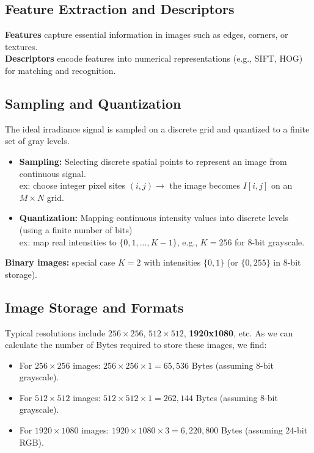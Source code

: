 \subsection{Feature Extraction and Descriptors}
\textbf{Features} capture essential information in images such as edges, corners, or textures.  \\
\textbf{Descriptors} encode features into numerical representations (e.g., SIFT, HOG) for matching and recognition.

\subsection{Sampling and Quantization}
The ideal irradiance signal is sampled on a discrete grid and quantized to a finite set of gray levels.
\begin{itemize}
    \item \textbf{Sampling:} Selecting discrete spatial points to represent an image from continuous signal.\\
    ex: choose integer pixel sites $(i,j) \rightarrow $  the image becomes $I[i,j]$ on an $M\times N$ grid.
    \item \textbf{Quantization:} Mapping continuous intensity values into discrete levels (using a finite number of bits) \\
    ex: map real intensities to $\{0,1,\dots,K-1\}$, e.g., $K=256$ for 8-bit grayscale.
\end{itemize}

\noindent \textbf{Binary images:} special case $K=2$ with intensities $\{0,1\}$ (or $\{0,255\}$ in 8-bit storage).




\subsection{Image Storage and Formats}
Typical resolutions include $256\times 256$, $512\times 512$, \textbf{1920x1080}, etc.%
As we can calculate the number of Bytes required to store these images, we find:

\begin{itemize}
    \item For $256\times 256$ images: $256 \times 256 \times 1 = 65,536$ Bytes (assuming 8-bit grayscale).
    \item For $512\times 512$ images: $512 \times 512 \times 1 = 262,144$ Bytes (assuming 8-bit grayscale).
    \item For $1920\times 1080$ images: $1920 \times 1080 \times 3 = 6,220,800$ Bytes (assuming 24-bit RGB).
\end{itemize}

